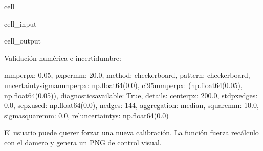 \documentclass[a4paper,10pt,spanish]{jupyterBook}
\begin{document}
\begin{sphinxuseclass}{cell}\begin{sphinxVerbatimInput}

\begin{sphinxuseclass}{cell_input}
\begin{sphinxVerbatim}[commandchars=\\\{\}]
  
    
\end{sphinxVerbatim}

\end{sphinxuseclass}\end{sphinxVerbatimInput}
\begin{sphinxVerbatimOutput}

\begin{sphinxuseclass}{cell_output}
\begin{sphinxVerbatim}[commandchars=\\\{\}]
Validación numérica e incertidumbre:
\end{sphinxVerbatim}

\begin{sphinxVerbatim}[commandchars=\\\{\}]
\PYGZob{}\PYGZsq{}mm\PYGZus{}per\PYGZus{}px\PYGZsq{}: 0.05,
 \PYGZsq{}px\PYGZus{}per\PYGZus{}mm\PYGZsq{}: 20.0,
 \PYGZsq{}method\PYGZsq{}: \PYGZsq{}checkerboard\PYGZsq{},
 \PYGZsq{}pattern\PYGZsq{}: \PYGZsq{}checkerboard\PYGZsq{},
 \PYGZsq{}uncertainty\PYGZus{}sigma\PYGZus{}mm\PYGZus{}per\PYGZus{}px\PYGZsq{}: np.float64(0.0),
 \PYGZsq{}ci95\PYGZus{}mm\PYGZus{}per\PYGZus{}px\PYGZsq{}: (np.float64(0.05), np.float64(0.05)),
 \PYGZsq{}diagnostics\PYGZus{}available\PYGZsq{}: True,
 \PYGZsq{}details\PYGZsq{}: \PYGZob{}\PYGZsq{}center\PYGZus{}px\PYGZsq{}: 200.0,
  \PYGZsq{}std\PYGZus{}px\PYGZus{}edges\PYGZsq{}: 0.0,
  \PYGZsq{}se\PYGZus{}px\PYGZus{}used\PYGZsq{}: np.float64(0.0),
  \PYGZsq{}n\PYGZus{}edges\PYGZsq{}: 144,
  \PYGZsq{}aggregation\PYGZsq{}: \PYGZsq{}median\PYGZsq{},
  \PYGZsq{}square\PYGZus{}mm\PYGZsq{}: 10.0,
  \PYGZsq{}sigma\PYGZus{}square\PYGZus{}mm\PYGZsq{}: 0.0,
  \PYGZsq{}rel\PYGZus{}uncertainty\PYGZus{}s\PYGZsq{}: np.float64(0.0)\PYGZcb{}\PYGZcb{}
\end{sphinxVerbatim}

\end{sphinxuseclass}\end{sphinxVerbatimOutput}

\end{sphinxuseclass}
\sphinxAtStartPar
{}
El usuario puede querer forzar una nueva calibración. La función  fuerza recálculo con el damero y genera un PNG de control visual.
\end{document}
